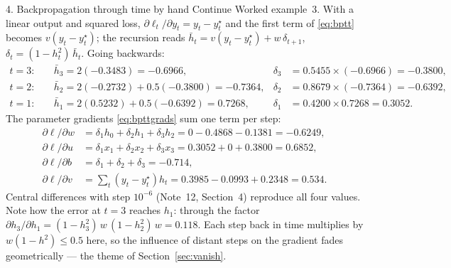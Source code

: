 \documentclass[11pt]{article}
\begin{document}
\begin{worked}{4. Backpropagation through time by hand}
Continue Worked example~3. With a linear output and squared loss, $\partial\ell_t/\partial y_t = y_t - y^\star_t$ and the
first term of \eqref{eq:bptt} becomes $v(y_t - y^\star_t)$; the recursion reads $\bar h_t = v(y_t - y^\star_t) + w\,\delta_{t+1}$,
$\delta_t = (1 - h_t^2)\,\bar h_t$. Going backwards:
\begin{align*}
  t = 3:&\quad \bar h_3 = 2(-0.3483) = -0.6966, & \delta_3 &= 0.5455 \times (-0.6966) = -0.3800, \\
  t = 2:&\quad \bar h_2 = 2(-0.2732) + 0.5(-0.3800) = -0.7364, & \delta_2 &= 0.8679 \times (-0.7364) = -0.6392, \\
  t = 1:&\quad \bar h_1 = 2(0.5232) + 0.5(-0.6392) = 0.7268, & \delta_1 &= 0.4200 \times 0.7268 = 0.3052 .
\end{align*}
The parameter gradients \eqref{eq:bpttgrads} sum one term per step:
\begin{align*}
  \partial \ell/\partial w &= \delta_1h_0 + \delta_2h_1 + \delta_3h_2 = 0 - 0.4868 - 0.1381 = -0.6249, \\
  \partial \ell/\partial u &= \delta_1x_1 + \delta_2x_2 + \delta_3x_3 = 0.3052 + 0 + 0.3800 = 0.6852, \\
  \partial \ell/\partial b &= \delta_1 + \delta_2 + \delta_3 = -0.714, \\
  \partial \ell/\partial v &= \textstyle\sum_t (y_t - y^\star_t)h_t = 0.3985 - 0.0993 + 0.2348 = 0.534 .
\end{align*}
Central differences with step $10^{-6}$ (Note~12, Section~4) reproduce all four values. Note how the error at $t = 3$
reaches $h_1$: through the factor $\partial h_3/\partial h_1 = (1 - h_3^2)\,w\,(1 - h_2^2)\,w = 0.118$. Each step back
in time multiplies by $w(1 - h^2) \le 0.5$ here, so the influence of distant steps on the gradient fades geometrically ---
the theme of Section~\ref{sec:vanish}.
\end{worked}
\end{document}
